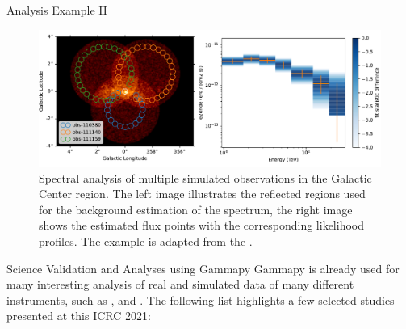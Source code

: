 \documentclass[
    final,
    ]{beamer}
\newlength{\colwidth}
\newcommand{\coloredhref}[3][blue]{\href{#2}{\color{#1}{#3}}}%
\begin{document}
\begin{frame}[t, fragile]
\begin{columns}[t]
\begin{column}{\colwidth}
\begin{block}{Analysis Example II}
    \begin{figure}
      \centering
      \includegraphics[width=\textwidth]{figures/cta-gc-image-spectrum.pdf}
      \caption{Spectral analysis of multiple simulated \coloredhref[pink]{https://www.cta-observatory.org}{CTA} observations in the Galactic Center region. The left image illustrates the reflected regions used for the  background estimation of the spectrum, the right image shows the estimated flux points with the
      corresponding likelihood profiles. The example is adapted from the \coloredhref[pink]{https://docs.gammapy.org/0.18.2/tutorials/cta_data_analysis.html}{cta data analysis tutorial}.}
    \end{figure}
  \end{block}
  \vspace{-36pt} 
  \begin{block}{Science Validation and Analyses using Gammapy}
  Gammapy is already used for many interesting analysis of real and simulated data of many different instruments, such as \coloredhref[pink]{https://www.mpi-hd.mpg.de/hfm/HESS/}{HESS}, \coloredhref[pink]{https://www.hawc-observatory.org}{HAWC} and \coloredhref[pink]{https://www.cta-observatory.org}{CTA}. The following list highlights a few selected studies presented at this ICRC 2021:


\end{block}
\end{column}
\end{columns}
\end{frame}
\end{document}
